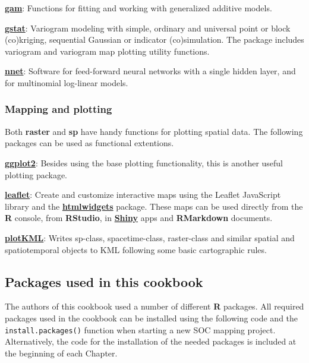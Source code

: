 \documentclass[
  10pt,
  b5paper,
  oneside]{book}
\theoremstyle{definition}
\theoremstyle{definition}
\theoremstyle{definition}
\theoremstyle{definition}
\theoremstyle{remark}
\begin{document}
\href{https://CRAN.R-project.org/package=gam}{\textbf{gam}}: Functions for fitting and working with generalized additive models.

\href{https://CRAN.R-project.org/package=gstat}{\textbf{gstat}}: Variogram modeling with simple, ordinary and universal point or block (co)kriging, sequential Gaussian or indicator (co)simulation. The package includes variogram and variogram map plotting utility functions.

\href{https://CRAN.R-project.org/package=nnet}{\textbf{nnet}}: Software for feed-forward neural networks with a single hidden layer, and for multinomial log-linear models.

\hypertarget{mapping-and-plotting}{%
\subsubsection{Mapping and plotting}\label{mapping-and-plotting}}

Both \textbf{raster} and \textbf{sp} have handy functions for plotting spatial data. The following packages can be used as functional extentions.

\href{https://cran.r-project.org/web/packages/ggplot2/index.html}{\textbf{ggplot2}}: Besides using the base plotting functionality, this is another useful plotting package.

\href{https://CRAN.R-project.org/package=leaflet}{\textbf{leaflet}}: Create and customize interactive maps using the Leaflet JavaScript library and the \href{https://cran.r-project.org/web/packages/htmlwidgets/index.html}{\textbf{htmlwidgets}} package. These maps can be used directly from the \textbf{R} console, from \textbf{RStudio}, in \href{https://shiny.rstudio.com/}{\textbf{Shiny}} apps and \textbf{RMarkdown} documents.

\href{https://CRAN.R-project.org/package=plotKML}{\textbf{plotKML}}: Writes sp-class, spacetime-class, raster-class and similar spatial and spatiotemporal objects to KML following some basic cartographic rules.

\hypertarget{packages-used-in-this-cookbook}{%
\subsection{Packages used in this cookbook}\label{packages-used-in-this-cookbook}}

The authors of this cookbook used a number of different \textbf{R} packages. All required packages used in the cookbook can be installed using the following code and the \texttt{install.packages()} function when starting a new SOC mapping project. Alternatively, the code for the installation of the needed packages is included at the beginning of each Chapter.
\end{document}
